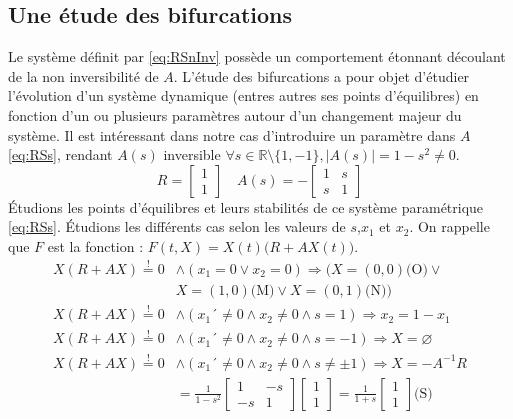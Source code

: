 \documentclass{wsdcr}
\begin{document}
\subsection{Une étude des bifurcations}
Le système définit par \ref{eq:RSnInv} possède un comportement étonnant découlant de la non inversibilité de $A$. L'étude des bifurcations a pour objet d'étudier l'évolution d'un système dynamique (entres autres ses points d'équilibres) en fonction d'un ou plusieurs paramètres autour d'un changement majeur du système. Il est intéressant dans notre cas d'introduire un paramètre dans $A$ \ref{eq:RSs}, rendant $A(s)$ inversible $\forall s \in \mathds{R}\setminus \{1,-1\}, |A(s)|=1-s^2 \neq 0 $.
\begin{equation}
R={\begin{bmatrix}1\\1\end{bmatrix}}\quad A(s) =-{\begin{bmatrix}1&s\\s&1\end{bmatrix}}
\label{eq:RSs}
\end{equation}
Étudions les points d'équilibres et leurs stabilités de ce système paramétrique \ref{eq:RSs}. Étudions les différents cas selon les valeurs de $s$,$x_1$ et $x_2$. On rappelle que $F$ est la fonction : $F(t,X)=X(t) {\Big (}R+AX(t){\Big )}$.
\begin{equation}
\begin{aligned}
X(R+AX)\overset{!}{=}0 &\land (x_1 = 0 \lor x_2 = 0) \Rightarrow (X=(0,0) \text{(O)} \lor \\ &X=(1,0) \text{(M)}\lor X=(0,1) \text{(N)})\\
X(R+AX)\overset{!}{=}0 &\land (x_1 ´\neq 0 \land x_2 \neq 0 \land s=1) \Rightarrow x_2=1-x_1 \\
X(R+AX)\overset{!}{=}0 &\land (x_1 ´\neq 0 \land x_2 \neq 0 \land s=-1) \Rightarrow X=\varnothing \\
X(R+AX)\overset{!}{=}0 &\land (x_1 ´\neq 0 \land x_2 \neq 0 \land s \neq \pm 1) \Rightarrow X=-A^{-1}R \\ &=\frac{1}{1-s^2}\begin{bmatrix}1&-s\\-s&1\end{bmatrix}\begin{bmatrix}1\\1\end{bmatrix}=\frac{1}{1+s}\begin{bmatrix}1\\1\end{bmatrix} \text{(S)}
\end{aligned}
\end{equation}
\end{document}
